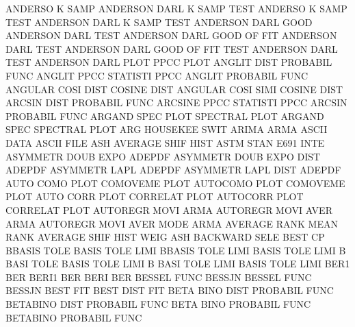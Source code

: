 ANDERSO  K    SAMP                      ANDERSON DARL K    SAMP TEST
ANDERSO  K    SAMP TEST                 ANDERSON DARL K    SAMP TEST
ANDERSON DARL GOOD                      ANDERSON DARL TEST
ANDERSON DARL GOOD OF   FIT             ANDERSON DARL TEST
ANDERSON DARL GOOD OF   FIT  TEST       ANDERSON DARL TEST
ANDERSON DARL PLOT                      PPCC     PLOT
ANGLIT   DIST                           PROBABIL FUNC
ANGLIT   PPCC                           STATISTI PPCC
ANGLIT                                  PROBABIL FUNC
ANGULAR  COSI DIST                      COSINE   DIST
ANGULAR  COSI SIMI                      COSINE   DIST
ARCSIN   DIST                           PROBABIL FUNC
ARCSINE  PPCC                           STATISTI PPCC
ARCSIN                                  PROBABIL FUNC
ARGAND   SPEC PLOT                      SPECTRAL PLOT
ARGAND   SPEC                           SPECTRAL PLOT
ARG                                     HOUSEKEE SWIT
ARIMA                                   ARMA
ASCII    DATA                           ASCII    FILE
ASH                                     AVERAGE  SHIF HIST
ASTM     STAN                           E691     INTE
ASYMMETR DOUB EXPO                      ADEPDF
ASYMMETR DOUB EXPO DIST                 ADEPDF
ASYMMETR LAPL                           ADEPDF
ASYMMETR LAPL DIST                      ADEPDF
AUTO     COMO PLOT                      COMOVEME PLOT
AUTOCOMO PLOT                           COMOVEME PLOT
AUTO     CORR PLOT                      CORRELAT PLOT
AUTOCORR PLOT                           CORRELAT PLOT
AUTOREGR MOVI                           ARMA
AUTOREGR MOVI AVER                      ARMA
AUTOREGR MOVI AVER MODE                 ARMA
AVERAGE  RANK                           MEAN     RANK
AVERAGE  SHIF HIST WEIG                 ASH
BACKWARD SELE                           BEST     CP
BBASIS   TOLE                           BASIS    TOLE LIMI
BBASIS   TOLE LIMI                      BASIS    TOLE LIMI
B        BASI TOLE                      BASIS    TOLE LIMI
B        BASI TOLE LIMI                 BASIS    TOLE LIMI
BER1                                    BER
BERI1                                   BER
BERI                                    BER
BESSEL   FUNC                           BESSJN
BESSEL   FUNC                           BESSJN
BEST     FIT                            BEST     DIST FIT
BETA     BINO DIST                      PROBABIL FUNC
BETABINO DIST                           PROBABIL FUNC
BETA     BINO                           PROBABIL FUNC
BETABINO                                PROBABIL FUNC
